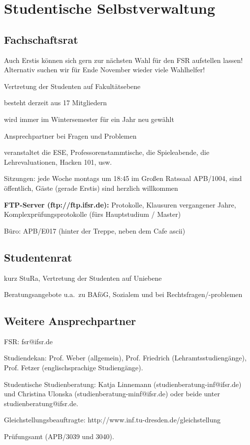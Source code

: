 \documentclass[a4paper,12pt]{report}
\begin{document}
\section{Studentische Selbstverwaltung}

\subsection{Fachschaftsrat}
\begin{itemize*}
    \item Auch Erstis können sich gern zur nächsten Wahl für den FSR aufstellen lassen! Alternativ suchen wir für Ende November wieder viele Wahlhelfer!
    \item Vertretung der Studenten auf Fakultätsebene
    \item besteht derzeit aus 17 Mitgliedern
    \item wird immer im Wintersemester für ein Jahr neu gewählt
    \item Ansprechpartner bei Fragen und Problemen
    \item veranstaltet die ESE, Professorenstammtische, die Spieleabende, die Lehrevaluationen, Hacken 101, usw.
    \item Sitzungen: jede Woche montags um 18:45 im Großen Ratssaal APB/1004, sind öffentlich, Gäste (gerade Erstis) sind herzlich willkommen
    \item \textbf{FTP-Server (ftp://ftp.ifsr.de):} Protokolle, Klausuren vergangener Jahre, Komplexprüfungsprotokolle (fürs Hauptstudium / Master)
    \item Büro: APB/E017 (hinter der Treppe, neben dem Cafe ascii)
\end{itemize*}

\subsection{Studentenrat}
\begin{itemize*}
    \item kurz StuRa, Vertretung der Studenten auf Uniebene
    \item Beratungsangebote u.a.\ zu BAföG, Sozialem und bei Rechtsfragen/-problemen
\end{itemize*}

\subsection{Weitere Ansprechpartner}
\begin{itemize*}
    \item FSR: fsr@ifsr.de
    \item Studiendekan: Prof. Weber (allgemein), Prof. Friedrich (Lehramtsstudiengänge), Prof. Fetzer (englischsprachige Studiengänge).
    \item Studentische Studienberatung: Katja Linnemann (studienberatung-inf@ifsr.de) und Christina Ulonska (studienberatung-minf@ifsr.de) oder beide unter studienberatung@ifsr.de.
    \item Gleichstellungsbeauftragte: http://www.inf.tu-dresden.de/gleichstellung
    \item Prüfungsamt (APB/3039 und 3040).
\end{itemize*}
\end{document}

